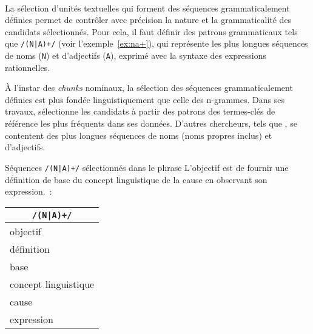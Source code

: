     ~\\La sélection d'unités textuelles qui forment des séquences
    grammaticalement définies permet de contrôler
    avec précision la nature et la grammaticalité des candidats sélectionnés.
    Pour cela, il faut définir des patrons grammaticaux tels que
    \texttt{/(N|A)+/} (voir l'exemple~\ref{ex:na+}), qui représente les plus
    longues séquences de noms (\texttt{N}) et d'adjectifs (\texttt{A}), exprimé
    avec la syntaxe des expressions rationnelles.

    À l'instar des \textit{chunks} nominaux, la sélection des séquences
    grammaticalement définies est plus fondée linguistiquement que celle des
    n-grammes. Dans ses travaux, 
    sélectionne les candidats à partir des patrons des termes-clés de référence
    les plus fréquents dans ses données. D'autres chercheurs,
    tels que , se contentent des plus longues
    séquences de noms (noms propres inclus) et d'adjectifs.

    \begin{example}\label{ex:na+}
      Séquences \texttt{/(N|A)+/} sélectionnés dans le phrase \og{}L'objectif
      est de fournir une définition de base du concept linguistique de la cause
      en observant son expression.\fg{}~:
      \begin{center}
        \begin{tabular}{l}
          \toprule
          \multicolumn{1}{c}{\textbf{\texttt{/(N|A)+/}}}\\
          \hline
          \og{}objectif\fg{}\\
          \og{}définition\fg{}\\
          \og{}base\fg{}\\
          \og{}concept linguistique\fg{}\\
          \og{}cause\\
          \og{}expression\fg{}\\
          \bottomrule
        \end{tabular}
      \end{center}\vspace{.25em}
    \end{example}

